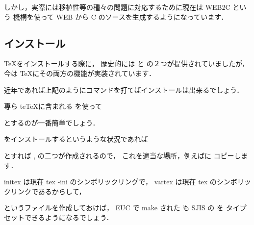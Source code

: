 しかし，実際には移植性等の種々の問題に対応するために現在は WEB2C という
機構を使って WEB から C のソースを生成するようになっています．

\subsection{インストール}

\TeX をインストールする際に，
歴史的には  と  の２つが提供されていましたが，
今は \TeX にその両方の機能が実装されています．

\begin{InTerm}
\end{InTerm}
近年であれば上記のようにコマンドを打てばインストールは出来るでしょう．

専ら te\TeX に含まれる を使って
\begin{InTerm}
\end{InTerm}
とするのが一番簡単でしょう．

\XeTeX をインストールするというような状況であれば
\begin{InTerm}
\end{InTerm}
とすれば , の二つが作成されるので，
これを適当な場所，例えばに
コピーします．


initex は現在 tex -ini のシンボリックリングで，
vartex は現在 tex のシンボリックリンクであるからして，
\begin{InTerm}
\end{InTerm}
というファイルを作成しておけば，
EUC で make された \pTeX も SJIS の  を
タイプセットできるようになるでしょう．



%
%
%
%
%

